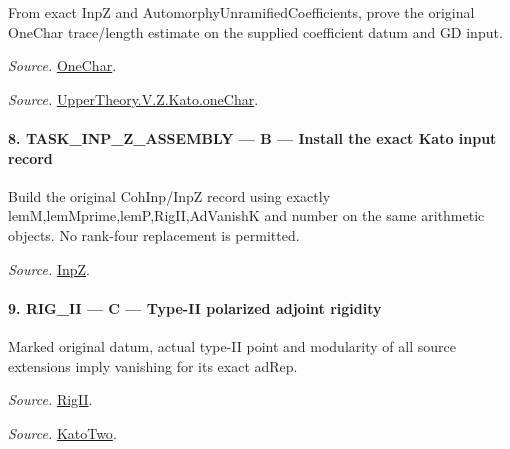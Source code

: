 \documentclass[11pt,a4paper]{article}
\numberwithin{equation}{section}
\theoremstyle{remark}\newtheorem{remark}[theorem]{Remark}
\begin{document}
From exact InpZ and AutomorphyUnramifiedCoefficients, prove the original OneChar trace/length estimate on the supplied coefficient datum and GD input.

\emph{Source.} \href{https://github.com/CocoSgt/riemann-hypothesis-lean/blob/7cbf7a0c32fca1badf05931879a37c3f8a2b03b4/src/Development/AutomorphicArithmetic/AutomorphicVarieties/UnitaryThreeGroups/KatoUse.lean#L54-L64}{OneChar}.

\emph{Source.} \href{https://github.com/CocoSgt/riemann-hypothesis-lean/blob/7cbf7a0c32fca1badf05931879a37c3f8a2b03b4/src/Development/AutomorphicArithmetic/AutomorphicVarieties/ModularityArgument/KatoQuadraticCharacters/OneChar.lean#L158-L178}{UpperTheory.V.Z.Kato.oneChar}.



\paragraph{8. TASK\_\allowbreak INP\_\allowbreak Z\_\allowbreak ASSEMBLY — B — Install the exact Kato input record}

Build the original CohInp/InpZ record using exactly lemM,lemMprime,lemP,RigII,AdVanishK and number on the same arithmetic objects. No rank-four replacement is permitted.

\emph{Source.} \href{https://github.com/CocoSgt/riemann-hypothesis-lean/blob/7cbf7a0c32fca1badf05931879a37c3f8a2b03b4/src/Development/AutomorphicArithmetic/AutomorphicVarieties/ModularityArgument/KatoQuadraticCharacters/KatoTwoOfUseN.lean#L55-L61}{InpZ}.



\paragraph{9. RIG\_\allowbreak II — C — Type-II polarized adjoint rigidity}

Marked original datum, actual type-II point and modularity of all source extensions imply vanishing for its exact adRep.

\emph{Source.} \href{https://github.com/CocoSgt/riemann-hypothesis-lean/blob/7cbf7a0c32fca1badf05931879a37c3f8a2b03b4/src/Development/AutomorphicArithmetic/AutomorphicVarieties/ModularityArgument/KatoQuadraticCharacters/KatoTwoOfUseN.lean#L49-L53}{RigII}.

\emph{Source.} \href{https://github.com/CocoSgt/riemann-hypothesis-lean/blob/7cbf7a0c32fca1badf05931879a37c3f8a2b03b4/src/Development/AutomorphicArithmetic/AutomorphicVarieties/ModularityArgument/KatoQuadraticCharacters/KatoTwoOfUseN.lean#L43-L47}{KatoTwo}.
\end{document}
